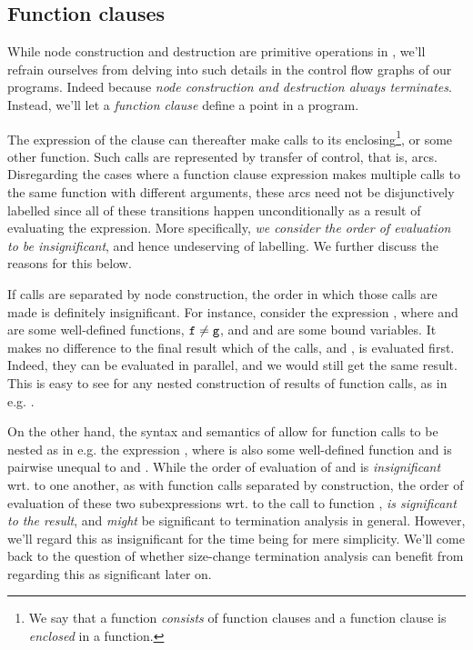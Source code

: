 \subsection{Function clauses}

While node construction and destruction are primitive operations in \D{}, we'll
refrain ourselves from delving into such details in the control flow graphs of
our programs. Indeed because \emph{node construction and destruction always
terminates}. Instead, we'll let a \emph{function clause} define a point in a
program.

The expression of the clause can thereafter make calls to its
enclosing\footnote{We say that a function \emph{consists} of function clauses
and a function clause is \emph{enclosed} in a function.}, or some other
function. Such calls are represented by transfer of control, that is, arcs.
Disregarding the cases where a function clause expression makes multiple calls
to the same function with different arguments, these arcs need not be
disjunctively labelled since all of these transitions happen unconditionally as
a result of evaluating the expression. More specifically, \emph{we consider the
order of evaluation to be insignificant}, and hence undeserving of labelling.
We further discuss the reasons for this below.

If calls are separated by node construction, the order in which those calls are
made is definitely insignificant. For instance, consider the expression
, where  and  are some well-defined
functions, $\text{{\ttfamily f}}\neq\text{{\ttfamily g}}$, and  and  are
some bound variables. It makes no difference to the final result which of the
calls,  and , is evaluated first. Indeed, they can be
evaluated in parallel, and we would still get the same result. This is easy to
see for any nested construction of results of function calls, as in e.g.
.

On the other hand, the syntax and semantics of \D{} allow for function calls to
be nested as in e.g. the expression , where  is
also some well-defined function and is pairwise unequal to  and
. While the order of evaluation of  and  is
\emph{insignificant} wrt. to one another, as with function calls separated by
construction, the order of evaluation of these two subexpressions wrt. to the
call to function , \emph{is significant to the result}, and
\emph{might} be significant to termination analysis in general. However, we'll
regard this as insignificant for the time being for mere simplicity. We'll come
back to the question of whether size-change termination analysis can benefit
from regarding this as significant later on.

